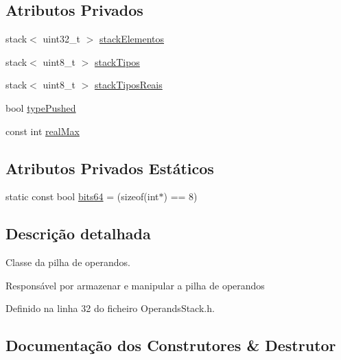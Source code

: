 \subsection*{Atributos Privados}
\begin{DoxyCompactItemize}
\item 
stack$<$ uint32\+\_\+t $>$ \hyperlink{classOperandsStack_a4d7bd7c3814e216168022849158c733d}{stack\+Elementos}
\item 
stack$<$ uint8\+\_\+t $>$ \hyperlink{classOperandsStack_ad784cabd1a3153f7a870adf07215189a}{stack\+Tipos}
\item 
stack$<$ uint8\+\_\+t $>$ \hyperlink{classOperandsStack_a14729c0f92cf41d1ec65660a7c82555a}{stack\+Tipos\+Reais}
\item 
bool \hyperlink{classOperandsStack_a375521777d4992bc1018eb40da015e70}{type\+Pushed}
\item 
const int \hyperlink{classOperandsStack_aac5d565f6032231c195411ba4d75d571}{real\+Max}
\end{DoxyCompactItemize}
\subsection*{Atributos Privados Estáticos}
\begin{DoxyCompactItemize}
\item 
static const bool \hyperlink{classOperandsStack_a52dbb05109d9b5c88bae178c6fdf00b3}{bits64} = (sizeof(int$\ast$) == 8)
\end{DoxyCompactItemize}


\subsection{Descrição detalhada}
Classe da pilha de operandos. 

Responsável por armazenar e manipular a pilha de operandos 

Definido na linha 32 do ficheiro Operands\+Stack.\+h.



\subsection{Documentação dos Construtores \& Destrutor}
\mbox{\label{classOperandsStack_a5ea2e7d609262388d0d4bc3ba08a2c32}} 
